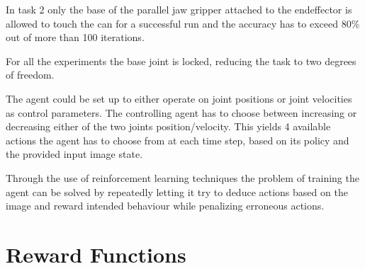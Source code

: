 \documentclass[10pt,journal,compsoc]{IEEEtran}
\begin{document}
In task 2 only the base of the parallel jaw gripper attached to the endeffector is allowed to touch the can for a successful run and the accuracy has to exceed 80\% out of more than 100 iterations.

For all the experiments the base joint is locked, reducing the task to two degrees of freedom.

The agent could be set up to either operate on joint positions or joint velocities as control parameters.
The controlling agent has to choose between increasing or decreasing either of the two joints position/velocity. This yields 4 available actions the agent has to choose from at each time step, based on its policy and the provided input image state.

Through the use of reinforcement learning techniques the problem of training the agent can be solved by repeatedly letting it try to deduce actions based on the image and reward intended behaviour while penalizing erroneous actions.




\section{Reward Functions}  
\end{document}
